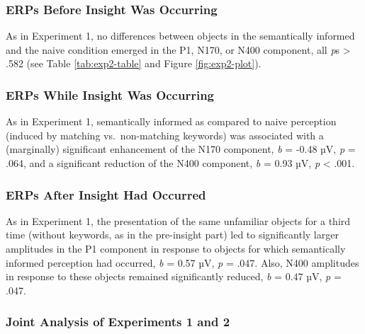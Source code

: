 \documentclass[
  english,
  doc,12pt,twoside,floatsintext]{apa7}
\begin{document}
\hypertarget{erps-before-insight-was-occurring-1}{%
\subsubsection{ERPs Before Insight Was Occurring}\label{erps-before-insight-was-occurring-1}}

As in Experiment 1, no differences between objects in the semantically informed and the naive condition emerged in the P1, N170, or N400 component, all \emph{p}s \textgreater{} .582 (see Table \ref{tab:exp2-table} and Figure \ref{fig:exp2-plot}).

\hypertarget{erps-while-insight-was-occurring-1}{%
\subsubsection{ERPs While Insight Was Occurring}\label{erps-while-insight-was-occurring-1}}

As in Experiment 1, semantically informed as compared to naive perception (induced by matching vs.~non-matching keywords) was associated with a (marginally) significant enhancement of the N170 component, \emph{b} = -0.48 µV, \emph{p} = .064, and a significant reduction of the N400 component, \emph{b} = 0.93 µV, \emph{p} \textless{} .001.

\hypertarget{erps-after-insight-had-occurred-1}{%
\subsubsection{ERPs After Insight Had Occurred}\label{erps-after-insight-had-occurred-1}}

As in Experiment 1, the presentation of the same unfamiliar objects for a third time (without keywords, as in the pre-insight part) led to significantly larger amplitudes in the P1 component in response to objects for which semantically informed perception had occurred, \emph{b} = 0.57 µV, \emph{p} = .047. Also, N400 amplitudes in response to these objects remained significantly reduced, \emph{b} = 0.47 µV, \emph{p} = .047.

\hypertarget{joint-analysis-of-experiments-1-and-2}{%
\subsubsection{Joint Analysis of Experiments 1 and 2}\label{joint-analysis-of-experiments-1-and-2}}
\end{document}

